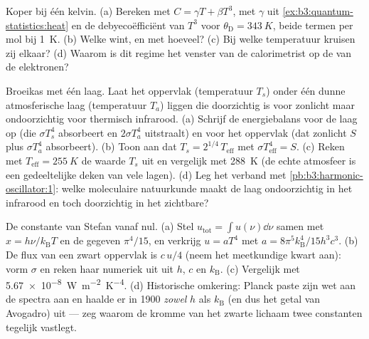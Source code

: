 \begin{exercise}[$\star\star$]\label{exo:b3:photons-phonons:8}
Koper bij één kelvin. (a) Bereken met $C = \gamma T + \beta T^3$, met
$\gamma$ uit \cref{ex:b3:quantum-statistics:heat} en de debyecoëfficiënt
van $T^3$ voor $\theta_{\text{D}} = \qty{343}{K}$, beide termen per mol bij
\qty{1}{K}. (b) Welke wint, en met hoeveel? (c) Bij welke temperatuur
kruisen zij elkaar? (d) Waarom is dit regime het venster van de
calorimetrist op de  van de elektronen?
\end{exercise}

\begin{exercise}[$\star\star$]\label{exo:b3:photons-phonons:9}
Broeikas met één laag. Laat het oppervlak (temperatuur $T_s$) onder één
dunne atmosferische laag (temperatuur $T_a$) liggen die doorzichtig is
voor zonlicht maar ondoorzichtig voor thermisch infrarood. (a) Schrijf de
energiebalans voor de laag op (die $\sigma T_s^4$ absorbeert en $2\sigma T_a^4$ uitstraalt) en voor het oppervlak (dat zonlicht $S$ plus $\sigma T_a^4$ absorbeert). (b) Toon aan dat $T_s = 2^{1/4}\,T_{\text{eff}}$ met
$\sigma T_{\text{eff}}^4 = S$. (c) Reken met $T_{\text{eff}} =
\qty{255}{K}$ de waarde $T_s$ uit en vergelijk met \qty{288}{K} (de echte
atmosfeer is een gedeeltelijke deken van vele lagen). (d) Leg het verband
met \cref{pb:b3:harmonic-oscillator:1}: welke moleculaire natuurkunde maakt
de laag ondoorzichtig in het infrarood en toch doorzichtig in het zichtbare?
\end{exercise}

\begin{exercise}[$\star\star\star$]\label{exo:b3:photons-phonons:10}
De constante van Stefan vanaf nul. (a) Stel $u_{\text{tot}} =
\int u(\nu)\dd\nu$ samen met $x = h\nu/k_{\text{B}}T$ en de gegeven
$\pi^4/15$, en verkrijg $u = aT^4$ met $a =
8\pi^5k_{\text{B}}^4/15h^3c^3$. (b) De flux van een zwart oppervlak is
$c\,u/4$ (neem het meetkundige kwart aan): vorm $\sigma$ en reken haar
numeriek uit uit $h$, $c$ en $k_{\text{B}}$. (c) Vergelijk met
\qty{5.67e-8}{W.m^{-2}.K^{-4}}. (d) Historische omkering: Planck paste
zijn wet aan de spectra aan en haalde er in 1900 \emph{zowel} $h$ als
$k_{\text{B}}$ (en dus het getal van Avogadro) uit --- zeg waarom de kromme
van het zwarte lichaam twee constanten tegelijk vastlegt.
\end{exercise}

